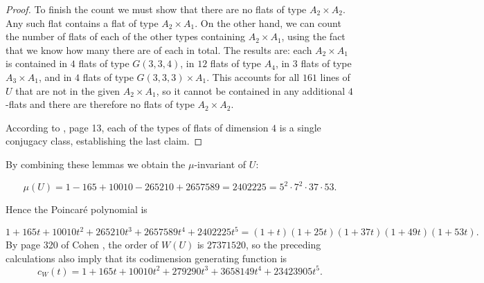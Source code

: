 \documentclass[11pt, reqno]{amsart}
\numberwithin{equation}{section}
\theoremstyle{definition}
\theoremstyle{plain}
\begin{document}
\begin{proof}
To finish the count we must show that there are no flats of type $A_2 \times A_2$. Any such flat contains a flat of type $A_2 \times A_1$. On the other hand, we can count the number of flats of each of the other types containing $A_2 \times A_1$, using the fact that we know how many there are of each in total. The results are: each $A_2 \times A_1$ is contained in $4$ flats of type $G(3,3,4)$, in $12$ flats of type $A_4$, in $3$ flats of type $A_3 \times A_1$, and in $4$ flats of type $G(3,3,3) \times A_1$. This accounts for all $161$ lines of $U$ that are not in the given $A_2 \times A_1$, so it cannot be contained in any additional $4$-flats and there are therefore no flats of type $A_2 \times A_2$.

According to \cite{BST}, page 13, each of the types of flats of dimension $4$ is a single conjugacy class, establishing the last claim.

\end{proof}

By combining these lemmas we obtain the $\mu$-invariant of $U$:

$$\mu(U)=1-165+10010-265210+2657589=2402225=5^2 \cdot 7^2 \cdot 37 \cdot 53.$$

Hence the Poincar\'e polynomial is

$$1+165t+10010t^2+265210 t^3+2657589t^4+2402225t^5=(1+t)(1+25t)(1+37t)(1+49t)(1+53t).$$ By page 320 of Cohen \cite{Coh}, the order of $W(U)$ is $27371520$, so the preceding calculations also imply that its codimension generating function is
$$c_W(t)=1+165t+10010t^2+279290t^3+3658149t^4+23423905t^5.$$
\end{document}
